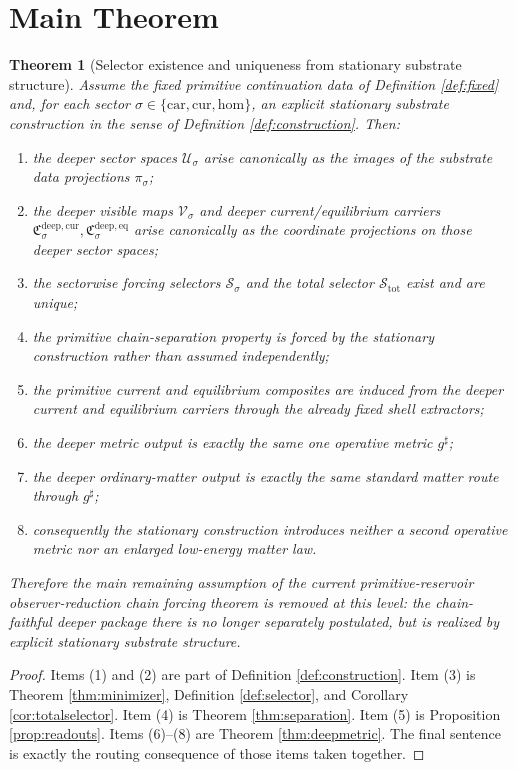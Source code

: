 \documentclass[11pt]{article}
\newcommand{\CompletedMetric}{g^{\sharp}}
\newcommand{\Car}{\mathrm{car}}
\newcommand{\Cur}{\mathrm{cur}}
\newcommand{\Hom}{\mathrm{hom}}
\newcommand{\DataProj}[1]{\pi_{#1}}
\newcommand{\DeepSpace}[1]{\mathcal U_{#1}}
\newcommand{\VisibleMap}[1]{\mathcal V_{#1}}
\newcommand{\DeepCurrentCarrier}[1]{\mathfrak C_{#1}^{\mathrm{deep,cur}}}
\newcommand{\DeepEqCarrier}[1]{\mathfrak C_{#1}^{\mathrm{deep,eq}}}
\newcommand{\ChainSelect}[1]{\mathcal S_{#1}}
\newcommand{\ChainSelectTriple}{\mathcal S_{\mathrm{tot}}}
\newtheorem{theorem}{Theorem}
\begin{document}
\section{Main Theorem}

\begin{theorem}[Selector existence and uniqueness from stationary substrate structure]
\label{thm:main}
Assume the fixed primitive continuation data of Definition \ref{def:fixed} and, for each sector \(\sigma\in\{\Car,\Cur,\Hom\}\), an explicit stationary substrate construction in the sense of Definition \ref{def:construction}. Then:
\begin{enumerate}
    \item the deeper sector spaces \(\DeepSpace{\sigma}\) arise canonically as the images of the substrate data projections \(\DataProj{\sigma}\);
    \item the deeper visible maps \(\VisibleMap{\sigma}\) and deeper current/equilibrium carriers \(\DeepCurrentCarrier{\sigma},\DeepEqCarrier{\sigma}\) arise canonically as the coordinate projections on those deeper sector spaces;
    \item the sectorwise forcing selectors \(\ChainSelect{\sigma}\) and the total selector \(\ChainSelectTriple\) exist and are unique;
    \item the primitive chain-separation property is forced by the stationary construction rather than assumed independently;
    \item the primitive current and equilibrium composites are induced from the deeper current and equilibrium carriers through the already fixed shell extractors;
    \item the deeper metric output is exactly the same one operative metric \(\CompletedMetric\);
    \item the deeper ordinary-matter output is exactly the same standard matter route through \(\CompletedMetric\);
    \item consequently the stationary construction introduces neither a second operative metric nor an enlarged low-energy matter law.
\end{enumerate}
Therefore the main remaining assumption of the current primitive-reservoir observer-reduction chain forcing theorem is removed at this level: the chain-faithful deeper package there is no longer separately postulated, but is realized by explicit stationary substrate structure.
\end{theorem}

\begin{proof}
Items (1) and (2) are part of Definition \ref{def:construction}. Item (3) is Theorem \ref{thm:minimizer}, Definition \ref{def:selector}, and Corollary \ref{cor:totalselector}. Item (4) is Theorem \ref{thm:separation}. Item (5) is Proposition \ref{prop:readouts}. Items (6)--(8) are Theorem \ref{thm:deepmetric}. The final sentence is exactly the routing consequence of those items taken together.
\end{proof}
\end{document}
